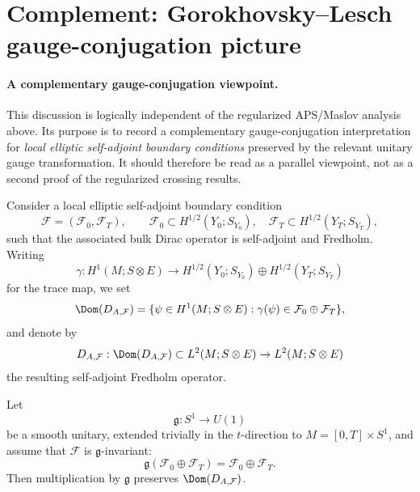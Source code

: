 \documentclass[11pt]{article}
\theoremstyle{definition}
\numberwithin{equation}{section}
\begin{document}
\section{Complement: Gorokhovsky--Lesch gauge-conjugation picture}\label{subsec:GLflow}

\paragraph{A complementary gauge-conjugation viewpoint.}
This discussion is logically independent of the regularized APS/Maslov analysis above. Its purpose is to record a complementary gauge-conjugation interpretation for \emph{local elliptic self-adjoint boundary conditions} preserved by the relevant unitary gauge transformation. It should therefore be read as a parallel viewpoint, not as a second proof of the regularized crossing results.

Consider a local elliptic self-adjoint boundary condition
\begin{equation}
\mathcal F=(\mathcal F_0,\mathcal F_T),
\qquad
\mathcal F_0\subset H^{1/2}(Y_0;S_{Y_0}),
\quad
\mathcal F_T\subset H^{1/2}(Y_T;S_{Y_T}),
\end{equation}
such that the associated bulk Dirac operator is self-adjoint and Fredholm. Writing
\begin{equation}
\gamma:H^1(M;S\otimes E)\to
H^{1/2}(Y_0;S_{Y_0})\oplus H^{1/2}(Y_T;S_{Y_T})
\end{equation}
for the trace map, we set
\begin{equation}\label{eq:Dom-DAF}
\Dom(D_{A,\mathcal F})
=
\{\psi\in H^1(M;S\otimes E):\gamma(\psi)\in \mathcal F_0\oplus\mathcal F_T\},
\end{equation}
and denote by
\begin{equation}
D_{A,\mathcal F}:\Dom(D_{A,\mathcal F})\subset L^2(M;S\otimes E)\to L^2(M;S\otimes E)
\end{equation}
the resulting self-adjoint Fredholm operator.

Let
\begin{equation}
\mathfrak g:S^1\to U(1)
\end{equation}
be a smooth unitary, extended trivially in the \(t\)-direction to \(M=[0,T]\times S^1\), and assume that \(\mathcal F\) is \(\mathfrak g\)-invariant:
\begin{equation}
\mathfrak g(\mathcal F_0\oplus\mathcal F_T)=\mathcal F_0\oplus\mathcal F_T.
\end{equation}
Then multiplication by \(\mathfrak g\) preserves \(\Dom(D_{A,\mathcal F})\).
\end{document}
